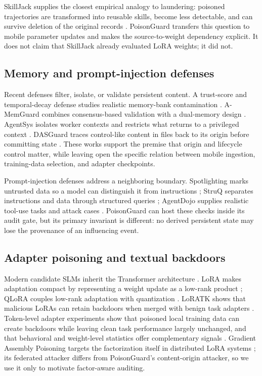 SkillJack supplies the closest empirical analogy to laundering: poisoned trajectories are transformed into reusable skills, become less detectable, and can survive deletion of the original records \cite{ying2026skilljack}. PoisonGuard transfers this question to mobile parameter updates and makes the source-to-weight dependency explicit. It does not claim that SkillJack already evaluated LoRA weights; it did not.

\subsection{Memory and prompt-injection defenses}

Recent defenses filter, isolate, or validate persistent content. A trust-score and temporal-decay defense studies realistic memory-bank contamination \cite{sunil2026memorypoison}. A-MemGuard combines consensus-based validation with a dual-memory design \cite{wei2025amemguard}. AgentSys isolates worker contexts and restricts what returns to a privileged context \cite{wen2026agentsys}. DASGuard traces control-like content in files back to its origin before committing state \cite{tan2026dasguard}. These works support the premise that origin and lifecycle control matter, while leaving open the specific relation between mobile ingestion, training-data selection, and adapter checkpoints.

Prompt-injection defenses address a neighboring boundary. Spotlighting marks untrusted data so a model can distinguish it from instructions \cite{hines2024spotlighting}; StruQ separates instructions and data through structured queries \cite{chen2024struq}; AgentDojo supplies realistic tool-use tasks and attack cases \cite{debenedetti2024agentdojo}. PoisonGuard can host these checks inside its audit gate, but its primary invariant is different: no derived persistent state may lose the provenance of an influencing event.

\subsection{Adapter poisoning and textual backdoors}

Modern candidate SLMs inherit the Transformer architecture \cite{vaswani2017attention}. LoRA makes adaptation compact by representing a weight update as a low-rank product \cite{hu2021lora}; QLoRA couples low-rank adaptation with quantization \cite{dettmers2023qlora}. LoRATK shows that malicious LoRAs can retain backdoors when merged with benign task adapters \cite{liu2024loratk}. Token-level adapter experiments show that poisoned local training data can create backdoors while leaving clean task performance largely unchanged, and that behavioral and weight-level statistics offer complementary signals \cite{lelle2026token}. Gradient Assembly Poisoning targets the factorization itself in distributed LoRA systems \cite{dong2026gap}; its federated attacker differs from PoisonGuard's content-origin attacker, so we use it only to motivate factor-aware auditing.

